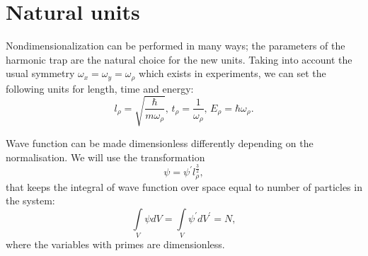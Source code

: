 \section{Natural units}

Nondimensionalization can be performed in many ways;
the parameters of the harmonic trap are the natural choice for the new units.
Taking into account the usual symmetry $\omega_x = \omega_y = \omega_\rho$ which exists in experiments,
we can set the following units for length, time and energy:
\[
	l_\rho = \sqrt{\frac{\hbar}{m\omega_\rho}},\,
	t_\rho = \frac{1}{\omega_\rho},\,
	E_\rho = \hbar \omega_\rho.
\]

Wave function can be made dimensionless differently depending on the normalisation.
We will use the transformation
\[
	\psi = \psi^\prime l_\rho^\frac{3}{2},
\]
that keeps the integral of wave function over space equal to number of particles in the system:
\[
	\int\limits_V \psi dV = \int\limits_V \psi^\prime dV^\prime = N,
\]
where the variables with primes are dimensionless.
